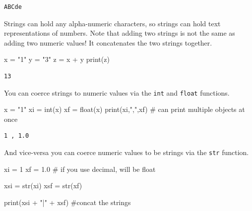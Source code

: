 \documentclass[
  letterpaper,
]{scrbook}
\newenvironment{Shaded}{\begin{snugshade}}{\end{snugshade}}
\newcommand{\BuiltInTok}[1]{\textcolor[rgb]{0.00,0.23,0.31}{#1}}
\newcommand{\CommentTok}[1]{\textcolor[rgb]{0.37,0.37,0.37}{#1}}
\newcommand{\DecValTok}[1]{\textcolor[rgb]{0.68,0.00,0.00}{#1}}
\newcommand{\FloatTok}[1]{\textcolor[rgb]{0.68,0.00,0.00}{#1}}
\newcommand{\NormalTok}[1]{\textcolor[rgb]{0.00,0.23,0.31}{#1}}
\newcommand{\OperatorTok}[1]{\textcolor[rgb]{0.37,0.37,0.37}{#1}}
\newcommand{\StringTok}[1]{\textcolor[rgb]{0.13,0.47,0.30}{#1}}
\begin{document}
\begin{verbatim}
ABCde
\end{verbatim}

Strings can hold any alpha-numeric characters, so strings can hold text
representations of numbers. Note that adding two strings is not the same
as adding two numeric values! It concatenates the two strings together.

\begin{Shaded}
\begin{Highlighting}[]
\NormalTok{x }\OperatorTok{=} \StringTok{"1"}
\NormalTok{y }\OperatorTok{=} \StringTok{"3"}
\NormalTok{z }\OperatorTok{=}\NormalTok{ x }\OperatorTok{+}\NormalTok{ y}
\BuiltInTok{print}\NormalTok{(z)}
\end{Highlighting}
\end{Shaded}

\begin{verbatim}
13
\end{verbatim}

You can coerce strings to numeric values via the \texttt{int} and
\texttt{float} functions.

\begin{Shaded}
\begin{Highlighting}[]
\NormalTok{x }\OperatorTok{=} \StringTok{"1"}
\NormalTok{xi }\OperatorTok{=} \BuiltInTok{int}\NormalTok{(x)}
\NormalTok{xf }\OperatorTok{=} \BuiltInTok{float}\NormalTok{(x)}
\BuiltInTok{print}\NormalTok{(xi,}\StringTok{","}\NormalTok{,xf) }\CommentTok{\# can print multiple objects at once}
\end{Highlighting}
\end{Shaded}

\begin{verbatim}
1 , 1.0
\end{verbatim}

And vice-versa you can coerce numeric values to be strings via the
\texttt{str} function.

\begin{Shaded}
\begin{Highlighting}[]
\NormalTok{xi }\OperatorTok{=} \DecValTok{1}
\NormalTok{xf }\OperatorTok{=} \FloatTok{1.0} \CommentTok{\# if you use decimal, will be float}

\NormalTok{xsi }\OperatorTok{=} \BuiltInTok{str}\NormalTok{(xi)}
\NormalTok{xsf }\OperatorTok{=} \BuiltInTok{str}\NormalTok{(xf)}

\BuiltInTok{print}\NormalTok{(xsi }\OperatorTok{+} \StringTok{"|"} \OperatorTok{+}\NormalTok{ xsf) }\CommentTok{\#concat the strings}
\end{Highlighting}
\end{Shaded}
\end{document}
